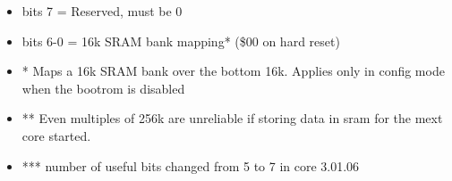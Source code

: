 \begin{itemize}
\item bits 7 = Reserved, must be 0
\item bits 6-0 = 16k SRAM bank mapping* (\$00 on hard reset)
\item[] * Maps a 16k SRAM bank over the bottom 16k. Applies only in
  config mode when the bootrom is disabled
\item[] ** Even multiples of 256k are unreliable if storing data in sram
  for the mext core started.
\item[] *** number of useful bits changed from 5 to 7 in core 3.01.06
\end{itemize}


